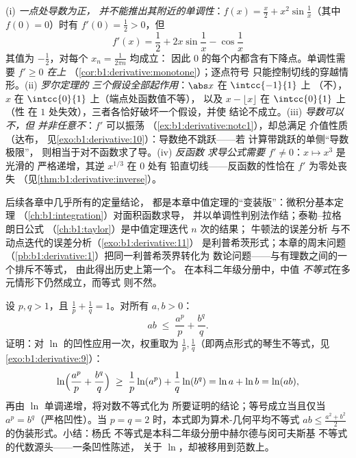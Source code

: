\begin{remark}[导数的常见误区]
(i) \emph{一点处导数为正，
并不能推出其附近的单调性}：$f(x) = \frac x2 + x^2\sin\frac1x$（其中
$f(0) = 0$）时有 $f'(0) = \frac12 > 0$，但
\[
f'(x) = \frac12 + 2x\sin\frac1x - \cos\frac1x
\]
其值为 $-\frac12$，对每个 $x_n = \frac{1}{2\pi n}$ 均成立：
因此 $0$ 的每个内都含有下降点。单调性需要 $f'
\geq 0$ \emph{在上}
（\cref{cor:b1:derivative:monotone}）；逐点符号
只能控制切线的穿越情形。(ii) \emph{罗尔定理的
三个假设全部起作用}：$\abs x$ 在 $\intcc{-1}{1}$ 上
（不），$x$ 在 $\intcc{0}{1}$ 上（端点处函数值不等），
以及 $x - \lfloor x\rfloor$ 在 $\intcc{0}{1}$ 上（性
在 $1$ 处失效），三者各恰好破坏一个假设，并使
结论不成立。(iii) \emph{导数可以不，但
并非任意不}：$f'$ 可以振荡
（\cref{ex:b1:derivative:notc1}），却总满足
介值性质（达布，
见\cref{exo:b1:derivative:10}）：导数绝不跳跃——若
计算带跳跃的单侧“导数极限”，
则相当于对不函数求了导。(iv) \emph{反函数
求导公式需要 $f' \neq 0$}：$x \mapsto x^3$ 是光滑的
严格递增，其逆 $x^{1/3}$ 在 $0$ 处有
铅直切线——反函数的性恰在
$f'$ 为零处丧失
（见\cref{thm:b1:derivative:inverse}）。
\end{remark}

\begin{remark}[中值定理接下来在哪里起作用]
后续各章中几乎所有的定量结论，
都是本章中值定理的“变装版”：微积分基本定理
（\cref{ch:b1:integration}）对面积函数求导，
并以单调性判别法作结；泰勒–拉格朗日公式
（\cref{ch:b1:taylor}）是中值定理迭代 $n$ 次的结果；
牛顿法的误差分析
与不动点迭代的误差分析（\cref{exo:b1:derivative:11}）
是利普希茨形式；本章的周末问题
（\cref{pb:b1:derivative:1}）把同一利普希茨界转化为
数论问题——与有理数之间的一个排斥不等式，
由此得出历史上第一个。
在本科二年级分册中，中值
\emph{不等式}在多元情形下仍然成立，而等式
则不然。
\end{remark}

\begin{example}[由凹性得到的杨氏不等式]\label{ex:b1:derivative:young}
设 $p, q > 1$，且 $\frac1p + \frac1q = 1$。对所有 $a, b > 0$：
\[
ab \;\leq\; \frac{a^p}{p} + \frac{b^q}{q} .
\]
证明：对 $\ln$ 的凹性应用一次，权重取为
$\frac1p, \frac1q$（即两点形式的琴生不等式，见
\cref{exo:b1:derivative:9}）：
\[
\ln\Bigl(\frac{a^p}{p} + \frac{b^q}{q}\Bigr)
\;\geq\; \frac1p \ln(a^p) + \frac1q \ln(b^q)
= \ln a + \ln b = \ln(ab),
\]
再由 $\ln$ 单调递增，将对数不等式化为
所要证明的结论；等号成立当且仅当 $a^p = b^q$（严格凹性）。当
$p = q = 2$ 时，本式即为算术-几何平均不等式 $ab \leq
\frac{a^2 + b^2}{2}$ 的伪装形式。小结：杨氏
不等式是本科二年级分册中赫尔德与闵可夫斯基
不等式的代数源头——一条凹性陈述，
关于 $\ln$，却被移用到范数上。
\end{example}

